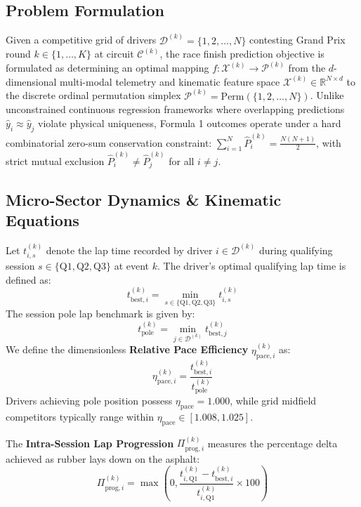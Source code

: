 \documentclass[journal]{IEEEtran}
\begin{document}
\subsection{Problem Formulation}
Given a competitive grid of drivers $\mathcal{D}^{(k)} = \{1, 2, \dots, N\}$ contesting Grand Prix round $k \in \{1, \dots, K\}$ at circuit $\mathcal{C}^{(k)}$, the race finish prediction objective is formulated as determining an optimal mapping $f: \mathcal{X}^{(k)} \to \mathcal{P}^{(k)}$ from the $d$-dimensional multi-modal telemetry and kinematic feature space $\mathcal{X}^{(k)} \in \mathbb{R}^{N \times d}$ to the discrete ordinal permutation simplex $\mathcal{P}^{(k)} = \text{Perm}(\{1, 2, \dots, N\})$. Unlike unconstrained continuous regression frameworks where overlapping predictions $\hat{y}_i \approx \hat{y}_j$ violate physical uniqueness, Formula 1 outcomes operate under a hard combinatorial zero-sum conservation constraint: $\sum_{i=1}^N \hat{P}_i^{(k)} = \frac{N(N + 1)}{2}$, with strict mutual exclusion $\hat{P}_i^{(k)} \ne \hat{P}_j^{(k)}$ for all $i \ne j$.

\subsection{Micro-Sector Dynamics \& Kinematic Equations}
Let $t_{i,s}^{(k)}$ denote the lap time recorded by driver $i \in \mathcal{D}^{(k)}$ during qualifying session $s \in \{\text{Q1}, \text{Q2}, \text{Q3}\}$ at event $k$. The driver's optimal qualifying lap time is defined as:
\begin{equation}
t_{\text{best}, i}^{(k)} = \min_{s \in \{\text{Q1}, \text{Q2}, \text{Q3}\}} t_{i,s}^{(k)}
\end{equation}
The session pole lap benchmark is given by:
\begin{equation}
t_{\text{pole}}^{(k)} = \min_{j \in \mathcal{D}^{(k)}} t_{\text{best}, j}^{(k)}
\end{equation}
We define the dimensionless \textbf{Relative Pace Efficiency} $\eta_{\text{pace}, i}^{(k)}$ as:
\begin{equation}
\eta_{\text{pace}, i}^{(k)} = \frac{t_{\text{best}, i}^{(k)}}{t_{\text{pole}}^{(k)}}
\end{equation}
Drivers achieving pole position possess $\eta_{\text{pace}} = 1.000$, while grid midfield competitors typically range within $\eta_{\text{pace}} \in [1.008, 1.025]$.

The \textbf{Intra-Session Lap Progression} $\Pi_{\text{prog}, i}^{(k)}$ measures the percentage delta achieved as rubber lays down on the asphalt:
\begin{equation}
\Pi_{\text{prog}, i}^{(k)} = \max\left(0, \frac{t_{i, \text{Q1}}^{(k)} - t_{\text{best}, i}^{(k)}}{t_{i, \text{Q1}}^{(k)}} \times 100\right)
\end{equation}
\end{document}
